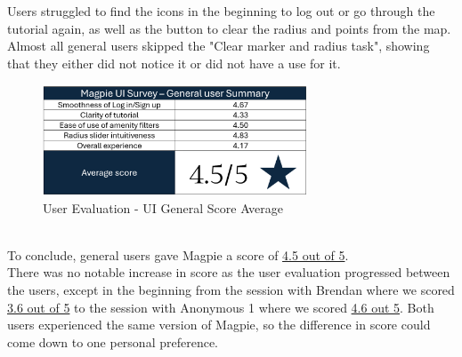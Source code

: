 Users struggled to find the icons in the beginning to log out or go through the
tutorial again, as well as the button to clear the radius and points from the
map. Almost all general users skipped the "Clear marker and radius task",
showing that they either did not notice it or did not have a use for it.
\begin{figure}[h!]
    \centering
    \includegraphics[width=0.7\textwidth]{images/survey-casual-summary.png}
    \caption{User Evaluation - UI General Score Average}
\end{figure}\\
To conclude, general users gave Magpie a score of \underline{4.5 out of 5}.\\
There was no notable increase in score as the user evaluation progressed between the users, except in the beginning from the session with Brendan where we scored \underline{3.6 out of 5} to the session with Anonymous 1 where we scored \underline{4.6 out 5}. Both users experienced the same version of Magpie, so the difference in score could come down to one personal preference.
